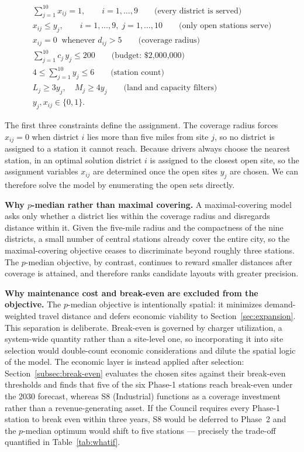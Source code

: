 \documentclass[12pt]{article}
\begin{document}
\begin{gather}
\sum_{j=1}^{10} x_{ij} = 1, \qquad i = 1,\ldots,9 \qquad \text{(every district is served)} \label{eq:serve} \\[4pt]
x_{ij} \le y_j, \qquad i = 1,\ldots,9,\; j = 1,\ldots,10 \qquad \text{(only open stations serve)} \label{eq:open} \\[4pt]
x_{ij} = 0 \;\; \text{whenever } d_{ij} > 5 \qquad \text{(coverage radius)} \label{eq:radius} \\[4pt]
\sum_{j=1}^{10} c_j \, y_j \le 200 \qquad \text{(budget: \$2{,}000{,}000)} \label{eq:budget} \\[4pt]
4 \le \sum_{j=1}^{10} y_j \le 6 \qquad \text{(station count)} \label{eq:count} \\[4pt]
L_j \ge 3 y_j, \quad M_j \ge 4 y_j \qquad \text{(land and capacity filters)} \label{eq:filters} \\[4pt]
y_j, x_{ij} \in \{0,1\}. \label{eq:binary}
\end{gather}

The first three constraints define the assignment. The coverage radius forces $x_{ij} = 0$ when district $i$ lies more than five miles from site $j$, so no district is assigned to a station it cannot reach. Because drivers always choose the nearest station, in an optimal solution district $i$ is assigned to the closest open site, so the assignment variables $x_{ij}$ are determined once the open sites $y_j$ are chosen. We can therefore solve the model by enumerating the open sets directly.

\textbf{Why $p$-median rather than maximal covering.} A maximal-covering model
asks only whether a district lies within the coverage radius and disregards
distance within it. Given the five-mile radius and the compactness of the nine
districts, a small number of central stations already cover the entire city, so
the maximal-covering objective ceases to discriminate beyond roughly three
stations. The $p$-median objective, by contrast, continues to reward smaller
distances after coverage is attained, and therefore ranks candidate layouts with
greater precision.

\textbf{Why maintenance cost and break-even are excluded from the objective.}
The $p$-median objective is intentionally spatial: it minimizes demand-weighted
travel distance and defers economic viability to Section~\ref{sec:expansion}.
This separation is deliberate. Break-even is governed by charger utilization,
a system-wide quantity rather than a site-level one, so incorporating it into
site selection would double-count economic considerations and dilute the
spatial logic of the model. The economic layer is instead applied after
selection: Section~\ref{subsec:break-even} evaluates the chosen sites against
their break-even thresholds and finds that five of the six Phase-1 stations
reach break-even under the 2030 forecast, whereas S8 (Industrial) functions as
a coverage investment rather than a revenue-generating asset. If the Council
requires every Phase-1 station to break even within three years, S8 would be
deferred to Phase~2 and the $p$-median optimum would shift to five stations ---
precisely the trade-off quantified in Table~\ref{tab:whatif}.
\end{document}
